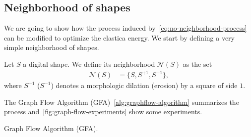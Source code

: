 \documentclass[review]{siamart220329}
\DeclareMathOperator*{\argmin}{arg\,min}
\begin{document}
\subsection{Neighborhood of shapes}
%
%
We are going to show how the process induced by~\cref{eq:no-neighborhood-process} can be modified to optimize the elastica energy. We start by defining a very simple neighborhood of shapes.
%
%
\begin{definition}
	Let $S$ a digital shape. We define its neighborhood $\mathcal{N}(S)$ as the set
	\begin{align*}
		\mathcal{N}(S) &= \Big\{S, S^{+1},S^{-1} \big\},
	\end{align*}
	where $S^{+1}$ ($S^{-1}$) denotes a morphologic dilation (erosion) by a square of side $1$.
\end{definition}
%
%
The Graph Flow Algorithm (GFA)~\ref{alg:graphflow-algorithm} summarizes the process and~\cref{fig:graph-flow-experiments} show some experiments.
%
%
\begin{algorithm}
 \caption{Graph Flow Algorithm (GFA).}
 \label{alg:graphflow-algorithm}  
\begin{algorithmic} 
 
	\STATE{$S^{(t+1)} \longleftarrow \displaystyle \argmin_{ S' \in \mathcal{C}^{(t)} }{ \hat{E}_{\vec{\theta}}(S')}$}		
  \ENDWHILE
\end{algorithmic}
\end{algorithm}
%
%
\end{document}
